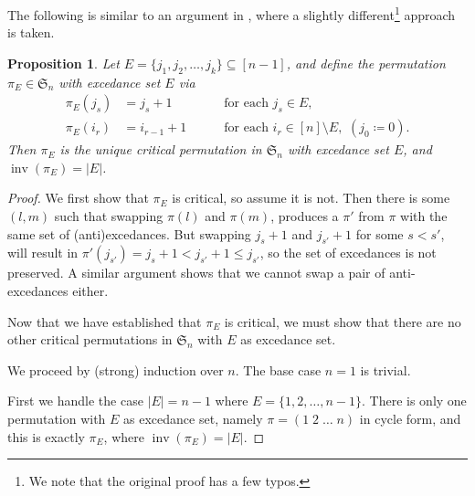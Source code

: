 \documentclass[reqno]{amsart}
\newtheorem{proposition}[theorem]{Proposition}
\theoremstyle{definition}
\newcommand{\symS}{\mathfrak{S}}
\DeclareMathOperator{\inv}{inv}
\begin{document}
The following is similar to an argument in \cite{Mantaci1993},
where a slightly different\footnote{We note that the original proof has a few typos.}
approach is taken.
\begin{proposition}\label{prop:mantaciInvolution}
Let $E=\{j_1,j_2,\dotsc,j_k\} \subseteq [n-1]$, and define the permutation $\pi_E \in \symS_n$
with excedance set $E$ via
\begin{align*}
    \pi_E(j_s) &=j_s+1 \quad &&\text{ for each } j_s\in E, \\
    \pi_E(i_r) &=i_{r-1}+1\quad &&\text{ for each } i_r\in [n]\setminus E, \,\,(j_0 \coloneqq 0).
\end{align*}
Then $\pi_E$ is the unique critical permutation in $\symS_n$ with excedance set $E$,
and $\inv(\pi_E)=|E|$.
\end{proposition}
\begin{proof}
We first show that $\pi_E$ is critical, so assume it is not. 
Then there is some $(l,m)$ such that swapping $\pi(l)$ and $\pi(m)$,
produces a $\pi'$ from $\pi$ with the same set of (anti)excedances.
But swapping $j_s+1$ and $j_{s'}+1$ for some $s < s'$, will result in 
$\pi'(j_{s'}) = j_s+1 < j_{s'}+1 \leq j_{s'}$,
so the set of excedances is not preserved.
A similar argument shows that we cannot swap a pair of anti-excedances
either.

Now that we have established that $\pi_E$ is critical, we must show that
there are no other critical permutations in $\symS_n$ with $E$ as excedance set.

We proceed by (strong) induction over $n$. The base case $n=1$ is trivial.

First we handle the case $|E|=n-1$ where $E = \{1,2,\dotsc,n-1\}$.
There is only one permutation with $E$ as excedance set,
namely $\pi = (1\;2\; \dotsc \; n)$ in cycle form, and this is exactly $\pi_E$,
where $\inv(\pi_E)=|E|$.


\end{proof}
\end{document}

